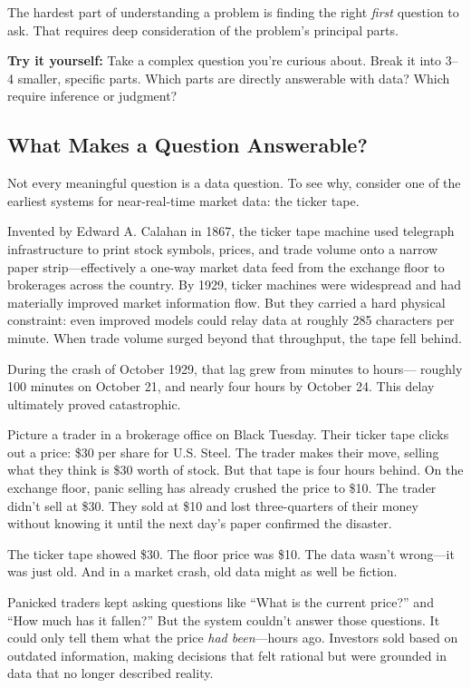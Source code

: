The hardest part of understanding a problem is finding the right \textit{first}
question to ask. That requires deep consideration of the problem's principal parts.

\begin{checkpoint}
\textbf{Try it yourself:} Take a complex question you're curious about. Break it into 3--4 smaller, specific parts. Which parts are directly answerable with data? Which require inference or judgment?
\end{checkpoint}

\subsection{What Makes a Question Answerable?}

Not every meaningful question is a data question. To see why, consider 
one of the earliest systems for near-real-time market data: the ticker tape.

Invented by Edward A. Calahan in 1867, the ticker tape machine used 
telegraph infrastructure to print stock symbols, prices, and trade volume 
onto a narrow paper strip---effectively a one-way market data feed from 
the exchange floor to brokerages across the country. By 1929, ticker 
machines were widespread and had materially improved market information 
flow. But they carried a hard physical constraint: even improved models 
could relay data at roughly 285 characters per minute. When trade volume 
surged beyond that throughput, the tape fell behind. 

During the crash of October 1929, that lag grew from minutes to hours---
roughly 100 minutes on October 21, and nearly four hours by October 24. 
This delay ultimately proved catastrophic.

Picture a trader in a brokerage office on Black Tuesday. Their ticker tape 
clicks out a price: \$30 per share for U.S. Steel. The trader makes their move, 
selling what they think is \$30 worth of stock. But that tape is four hours 
behind. On the exchange floor, panic selling has already crushed the price 
to \$10. The trader didn't sell at \$30. They sold at \$10 and lost three-quarters 
of their money without knowing it until the next day's paper confirmed the 
disaster.

The ticker tape showed \$30. The floor price was \$10. The data wasn't 
wrong---it was just old. And in a market crash, old data might as well be 
fiction.

Panicked traders kept asking questions like ``What is the current price?'' 
and ``How much has it fallen?'' But the system couldn't answer those 
questions. It could only tell them what the price \textit{had been}---hours 
ago. Investors sold based on outdated information, making decisions that 
felt rational but were grounded in data that no longer described reality.

